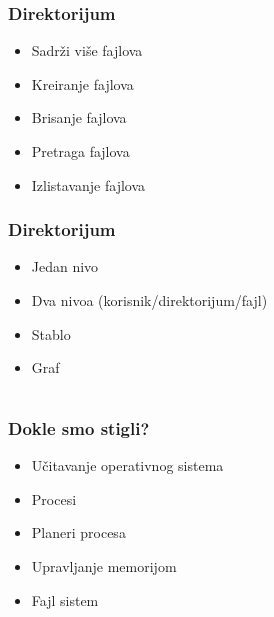 \documentclass{beamer}
\begin{document}
\begin{frame}
    \frametitle{Direktorijum}
    \begin{itemize}
        \item Sadrži više fajlova \newline
        \item Kreiranje fajlova \newline
        \item Brisanje fajlova \newline
        \item Pretraga fajlova \newline
        \item Izlistavanje fajlova
    \end{itemize}
\end{frame}

\begin{frame}
    \frametitle{Direktorijum}
    \begin{itemize}
        \item Jedan nivo \newline
        \item Dva nivoa (korisnik/direktorijum/fajl) \newline
        \item Stablo \newline
        \item Graf
    \end{itemize}
\end{frame}

\section*{}
\subsection*{}

\begin{frame}
    \frametitle{Dokle smo stigli?}
    \begin{itemize}
        \item Učitavanje operativnog sistema \newline
        \item Procesi \newline
        \item Planeri procesa \newline
        \item Upravljanje memorijom \newline
        \item Fajl sistem
    \end{itemize}
\end{frame}
\end{document}
